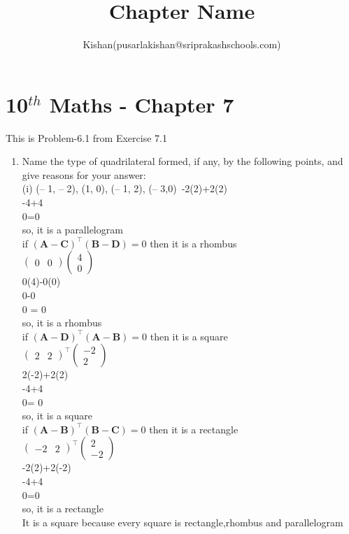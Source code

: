 \documentclass[12pt]{article}
\title{Chapter Name}
\author{Kishan(pusarlakishan@sriprakashschools.com)}
\newcommand{\myvec}[1]{\ensuremath{\begin{pmatrix}#1\end{pmatrix}}}
\providecommand{\brak}[1]{\ensuremath{\left(#1\right)}}
\let\vec\mathbf
\begin{document}
\maketitle
\section*{10$^{th}$ Maths - Chapter 7}
This is Problem-6.1 from Exercise 7.1
\begin{enumerate}
\item Name the type of quadrilateral formed, if any, by the following points, and give reasons for your answer:  \\ 
(i) (– 1, – 2), (1, 0), (– 1, 2), (– 3,0)\
-2(2)+2(2)\\
-4+4\\
0=0\\

so, it is a parallelogram\\

if $\brak{\vec{A}-\vec{C}}^{\top}\brak{\vec{B}-\vec{D}}=0$ then it is a rhombus\\
$\myvec{0&0}{\myvec{4\\0}}$\\
0(4)-0(0)\\
0-0\\
0 = 0\\

so, it is a rhombus\\

if $\brak{\vec{A}-\vec{D}}^{\top}\brak{\vec{A}-\vec{B}}=0$ then it is a square\\
$\myvec{2&2}^{\top}{\myvec{-2\\2}}$\\
2(-2)+2(2)\\
-4+4\\
0= 0\\

so, it is a square\\

if $\brak{\vec{A}-\vec{B}}^{\top}\brak{\vec{B}-\vec{C}}=0$ then it is a rectangle\\
$\myvec{-2&2}^{\top}{\myvec{2\\-2}}$\\
-2(2)+2(-2)\\
-4+4\\
0=0\\

so, it is a rectangle\\ 
It is a square because every square is rectangle,rhombus and parallelogram
\end{enumerate}
\end{document}
